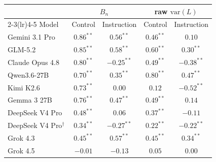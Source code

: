 \begin{tabular}{lcccc}
\toprule
 & \multicolumn{2}{c}{$B_n$} & \multicolumn{2}{c}{raw $\mathrm{var}(L)$} \\
\cmidrule(lr){2-3}\cmidrule(lr){4-5}
Model & Control & Instruction & Control & Instruction \\
\midrule
Gemini 3.1 Pro & $0.86^{**}$ & $0.56^{**}$ & $0.46^{**}$ & $0.10$ \\
GLM-5.2 & $0.85^{**}$ & $0.58^{**}$ & $0.60^{**}$ & $0.30^{**}$ \\
Claude Opus 4.8 & $0.80^{**}$ & $-0.25^{**}$ & $0.49^{**}$ & $-0.38^{**}$ \\
Qwen3.6-27B & $0.70^{**}$ & $0.35^{**}$ & $0.80^{**}$ & $0.47^{**}$ \\
Kimi K2.6 & $0.73^{**}$ & $0.00$ & $0.12$ & $-0.52^{**}$ \\
Gemma 3 27B & $0.76^{**}$ & $0.47^{**}$ & $0.49^{**}$ & $0.14$ \\
DeepSeek V4 Pro & $0.48^{**}$ & $0.06$ & $0.37^{**}$ & $-0.11$ \\
DeepSeek V4 Pro$^{\dagger}$ & $0.34^{**}$ & $-0.27^{**}$ & $0.22^{**}$ & $-0.22^{**}$ \\
Grok 4.3 & $0.45^{**}$ & $0.57^{**}$ & $0.45^{**}$ & $0.34^{**}$ \\
Grok 4.5 & $-0.01$ & $-0.13$ & $0.05$ & $0.00$ \\
\bottomrule
\end{tabular}
